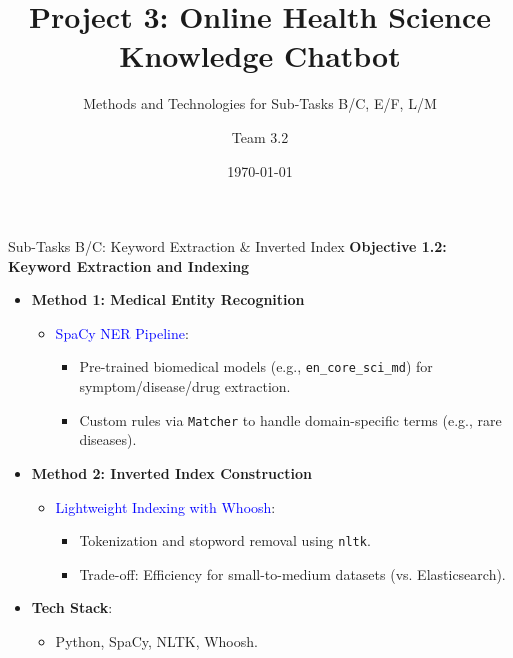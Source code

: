 \documentclass{beamer}
\title{Project 3: Online Health Science Knowledge Chatbot}
\subtitle{Methods and Technologies for Sub-Tasks B/C, E/F, L/M}
\author{Team 3.2}
\date{\today}
\begin{document}
\frame{\titlepage}

\begin{frame}{Sub-Tasks B/C: Keyword Extraction \& Inverted Index}
\footnotesize
\textbf{Objective 1.2: Keyword Extraction and Indexing}
\begin{itemize}
    \item \textbf{Method 1: Medical Entity Recognition}
    \begin{itemize}
        \item \textcolor{blue}{SpaCy NER Pipeline}:
        \begin{itemize}
            \item Pre-trained biomedical models (e.g., \texttt{en\_core\_sci\_md}) for symptom/disease/drug extraction.
            \item Custom rules via \texttt{Matcher} to handle domain-specific terms (e.g., rare diseases).
        \end{itemize}
    \end{itemize}
    
    \item \textbf{Method 2: Inverted Index Construction}
    \begin{itemize}
        \item \textcolor{blue}{Lightweight Indexing with Whoosh}:
        \begin{itemize}
            \item Tokenization and stopword removal using \texttt{nltk}.
            \item Trade-off: Efficiency for small-to-medium datasets (vs. Elasticsearch).
        \end{itemize}
    \end{itemize}
    
    \item \textbf{Tech Stack}:
    \begin{itemize}
        \item Python, SpaCy, NLTK, Whoosh.
    \end{itemize}
\end{itemize}
\end{frame}
\end{document}
